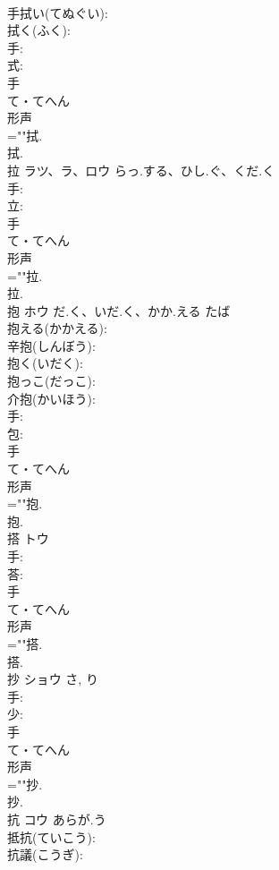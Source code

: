 \documentclass[8pt]{extreport}
\begin{document}
\begin{CJK}{UTF8}{min}
\\	手拭い(てぬぐい): 
\\	拭く(ふく): 
\\	手: 
\\	式: 
\\	手	
\\	て・てへん	
\\	形声 
\\	=""拭.
\\	拭.
\\	拉	ラツ、ラ、ロウ	らっ.する、ひし.ぐ、くだ.く		
\\	手: 
\\	立: 
\\	手	
\\	て・てへん	
\\	形声 
\\	=""拉.
\\	拉.
\\	抱	ホウ	だ.く、いだ.く、かか.える	たば	
\\	抱える(かかえる): 
\\	辛抱(しんぼう): 
\\	抱く(いだく): 
\\	抱っこ(だっこ): 
\\	介抱(かいほう): 
\\	手: 
\\	包: 
\\	手	
\\	て・てへん	
\\	形声 
\\	=""抱.
\\	抱.
\\	搭	トウ			
\\	手: 
\\	荅: 
\\	手	
\\	て・てへん	
\\	形声 
\\	=""搭.
\\	搭.
\\	抄	ショウ		さ, り	
\\	手: 
\\	少: 
\\	手	
\\	て・てへん	
\\	形声 
\\	=""抄.
\\	抄.
\\	抗	コウ	あらが.う		
\\	抵抗(ていこう): 
\\	抗議(こうぎ): 

\end{CJK}
\end{document}
